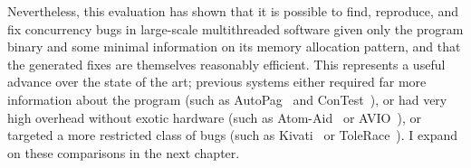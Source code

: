 Nevertheless, this evaluation has shown that it is possible to find,
reproduce, and fix concurrency bugs in large-scale multithreaded
software given only the program binary and some minimal information on
its memory allocation pattern, and that the generated fixes are
themselves reasonably efficient.  This represents a useful advance
over the state of the art; previous systems either required far more
information about the program (such as AutoPag~\cite{Lin2007} and
ConTest~\cite{FFFKrena2007}), or had very high overhead without exotic
hardware (such as Atom-Aid~\cite{Lucia2009} or AVIO~\cite{Lu}), or
targeted a more restricted class of bugs (such as
Kivati~\cite{Chew2010} or ToleRace~\cite{Kirovski2007}).  I expand on
these comparisons in the next chapter.

